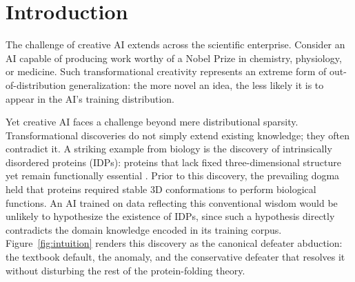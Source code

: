 \documentclass{article}
\theoremstyle{definition}
\begin{document}
\begin{abstract}
producing a competitive dynamic that measures robustness, grounding, and creativity as complementary evaluation signals. Finally, we report a difficulty extension (\textsc{DeFAb-Hard}, 235 pre-registered Level~3 instances along three orthogonal axes: high predicate novelty H1, deep derivation chains H2, multi-anomaly resolution H3) and a closed-loop rules-of-engagement experiment (E4) on the live SC2 bridge. The complete \textsc{DeFAb-Hard} four-model panel (May~11, 2026) reveals a 36:1 ratio between the best and worst performing frontier models: DeepSeek-R1 achieves $53.3\%$ pooled (H2 CoT $98.9\%$, matching the symbolic solver on the deep-chain axis), GPT-5.2 achieves $39.1\%$, Kimi-K2.5 $3.8\%$, and Claude Sonnet~4.6 $1.5\%$. The H3 multi-anomaly axis is the universal bottleneck, dropping even DeepSeek from $98.9\%$ (H2) to $59.0\%$ (H3). A response-level audit attributes the Claude collapse to task-format brittleness rather than reasoning failure: Claude returns the antecedent fact instead of a defeater rule under direct prompts and produces lengthy step-by-step reasoning that never terminates in a parseable rule under CoT. The E4 quiz-mode evaluation across all four frontier models in three enforcement modes (B0~trust, B1~audit, B2~verifier-gated re-prompt) finds $100\%$ verifier compliance on every order admitted; the discriminating signal is correct-abstain rate, where DeepSeek-R1's B1 audit-only mode achieves a perfect $6/6$ while Kimi-K2.5 collapses to a degenerate zero-order policy in every mode.
\end{abstract}


\section{Introduction}\label{sec:introduction}
The challenge of creative AI extends across the scientific enterprise. Consider an AI capable of producing work worthy of a Nobel Prize in chemistry, physiology, or medicine. Such transformational creativity represents an extreme form of out-of-distribution generalization: the more novel an idea, the less likely it is to appear in the AI's training distribution.

Yet creative AI faces a challenge beyond mere distributional sparsity. Transformational discoveries do not simply extend existing knowledge; they often contradict it. A striking example from biology is the discovery of intrinsically disordered proteins (IDPs): proteins that lack fixed three-dimensional structure yet remain functionally essential \cite{dunker2001intrinsically}. Prior to this discovery, the prevailing dogma held that proteins required stable 3D conformations to perform biological functions. An AI trained on data reflecting this conventional wisdom would be unlikely to hypothesize the existence of IDPs, since such a hypothesis directly contradicts the domain knowledge encoded in its training corpus. Figure~\ref{fig:intuition} renders this discovery as the canonical defeater abduction: the textbook default, the anomaly, and the conservative defeater that resolves it without disturbing the rest of the protein-folding theory.
\end{document}
